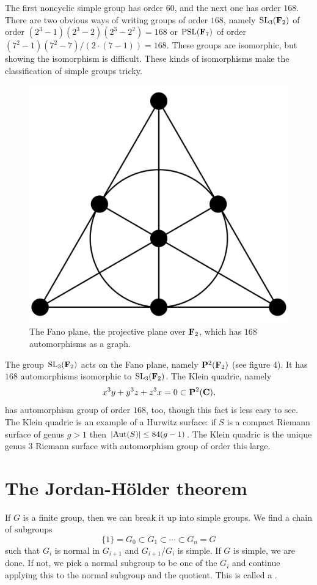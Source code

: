 \documentclass[11pt, oneside]{amsart}
\begin{document}
The first noncyclic simple group has order $60$, and the next one has order $168$. There are two obvious ways of writing groups of order $168$, namely $\operatorname{SL}_3(\mathbf F_2)$ of order $(2^3-1)(2^3 - 2)(2^3 - 2^2) = 168$ or $\operatorname{PSL}(\mathbf F_7)$ of order $(7^2 - 1)(7^2-7)/(2\cdot(7-1)) =168$. These groups are isomorphic, but showing the isomorphism is difficult. These kinds of isomorphisms make the classification of simple groups tricky.
\begin{figure}
\centering
\includegraphics[scale=0.1]{images/fano_plane}
\caption{The Fano plane, the projective plane over $\mathbf F_2$, which has $168$ automorphisms as a graph.}
\end{figure}
The group $\operatorname{SL}_3(\mathbf F_2)$ acts on the Fano plane, namely $\mathbf P^2(\mathbf F_2)$ (see figure 4). It has $168$ automorphisms isomorphic to $\operatorname{SL}_3(\mathbf F_2)$. The Klein quadric, namely 
$$
x^3y + y^3z + z^3x = 0\subset \mathbf P^2(\mathbf C),
$$
has automorphism group of order $168$, too, though this fact is less easy to see. The Klein quadric is an example of a Hurwitz surface: if $S$ is a compact Riemann surface of genus $g> 1$ then $\left \lvert \operatorname{Aut} (S) \right \rvert \le  84(g-1)$. The Klein quadric is the unique genus $3$ Riemann surface with automorphism group of order this large.

\section{The Jordan-Hölder theorem}
If $G$ is a finite group, then we can break it up into simple groups. We find a chain of subgroups
$$
\{1\} = G_0 \subset G_1 \subset \cdots\subset G_n = G
$$
such that $G_i$ is normal in $G_{i+1}$ and $G_{i+1}/G_i$ is simple. If $G$ is simple, we are done. If not, we pick a normal subgroup to be one of the $G_i$ and continue applying this to the normal subgroup and the quotient. This is called a . 
\end{document}
